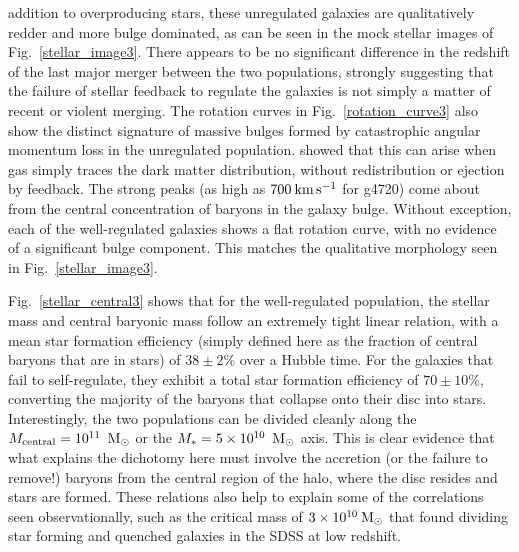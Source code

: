 addition to overproducing stars, these unregulated galaxies are qualitatively
redder and more bulge dominated, as can be seen in the mock stellar images of
Fig.~\ref{stellar_image3}.  There appears to be no significant difference in
the redshift of the last major merger between the two populations, strongly
suggesting that the failure of stellar feedback to regulate the galaxies is not
simply a matter of recent or violent merging.  The rotation curves in
Fig.~\ref{rotation_curve3} also show the distinct signature of massive bulges
formed by catastrophic angular momentum loss in the unregulated population.
\citet{vanDenBosch2001} showed that this can arise when gas simply traces the
dark matter distribution, without redistribution or ejection by feedback.  The
strong peaks (as high as $700\>{\rm km}\,{\rm s}^{-1}$ for g4720) come about from the central
concentration of baryons in the galaxy bulge.  Without exception, each of the
well-regulated galaxies shows a flat rotation curve, with no evidence of a
significant bulge component.  This matches the qualitative morphology seen in
Fig.~\ref{stellar_image3}.

Fig.~\ref{stellar_central3} shows that for the well-regulated population, the
stellar mass and central baryonic mass follow an extremely tight linear
relation, with a mean star formation efficiency (simply defined here as the
fraction of central baryons that are in stars) of $38\pm2\%$ over a Hubble time.
For the galaxies that fail to self-regulate, they exhibit a total star formation
efficiency of $70\pm10\%$, converting the majority of the baryons that collapse
onto their disc into stars.  Interestingly, the two populations can be divided
cleanly along the $M_{\rm central}=10^{11}\;\>{\rm M_{\odot}}$ or the
$M_*=5\times10^{10}\;\>{\rm M_{\odot}}$ axis.  This is clear evidence that what explains
the dichotomy here must involve the accretion (or the failure to remove!)
baryons from the central region of the halo, where the disc resides and stars
are formed.  These relations also help to explain some of the correlations seen
observationally, such as the critical mass of $3\times10^{10}\>{\rm M_{\odot}}$ that 
\citet{Kauffmann2003a} found dividing star forming and quenched galaxies in the
SDSS at low redshift.

